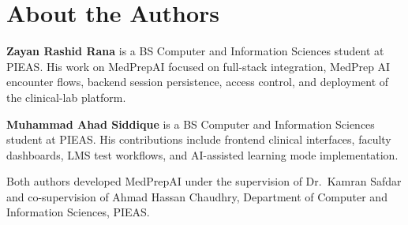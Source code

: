 \chapter*{About the Authors}

\noindent\textbf{Zayan Rashid Rana} is a BS Computer and Information Sciences student at PIEAS. His work on MedPrepAI focused on full-stack integration, MedPrep AI encounter flows, backend session persistence, access control, and deployment of the clinical-lab platform.

\vspace{0.8cm}
\noindent\textbf{Muhammad Ahad Siddique} is a BS Computer and Information Sciences student at PIEAS. His contributions include frontend clinical interfaces, faculty dashboards, LMS test workflows, and AI-assisted learning mode implementation.

\vspace{0.8cm}
\noindent Both authors developed MedPrepAI under the supervision of Dr.\ Kamran Safdar and co-supervision of Ahmad Hassan Chaudhry, Department of Computer and Information Sciences, PIEAS.
